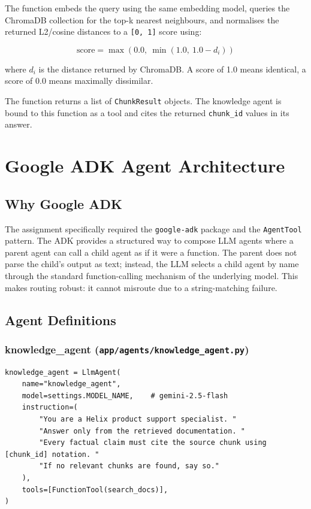 \documentclass[12pt,a4paper]{article}
\begin{document}
The function embeds the query using the same embedding model, queries the ChromaDB collection for the top-k nearest neighbours, and normalises the returned L2/cosine distances to a \texttt{[0, 1]} score using:

\begin{equation}
\text{score} = \max\!\left(0.0,\ \min\!\left(1.0,\ 1.0 - d_i\right)\right)
\end{equation}

where $d_i$ is the distance returned by ChromaDB. A score of 1.0 means identical, a score of 0.0 means maximally dissimilar.

The function returns a list of \texttt{ChunkResult} objects. The knowledge agent is bound to this function as a tool and cites the returned \texttt{chunk\_id} values in its answer.

\section{Google ADK Agent Architecture}

\subsection{Why Google ADK}

The assignment specifically required the \texttt{google-adk} package and the \texttt{AgentTool} pattern. The ADK provides a structured way to compose LLM agents where a parent agent can call a child agent as if it were a function. The parent does not parse the child's output as text; instead, the LLM selects a child agent by name through the standard function-calling mechanism of the underlying model. This makes routing robust: it cannot misroute due to a string-matching failure.

\subsection{Agent Definitions}

\subsubsection{knowledge\_agent (\texttt{app/agents/knowledge\_agent.py})}

\begin{lstlisting}[style=python]
knowledge_agent = LlmAgent(
    name="knowledge_agent",
    model=settings.MODEL_NAME,    # gemini-2.5-flash
    instruction=(
        "You are a Helix product support specialist. "
        "Answer only from the retrieved documentation. "
        "Every factual claim must cite the source chunk using [chunk_id] notation. "
        "If no relevant chunks are found, say so."
    ),
    tools=[FunctionTool(search_docs)],
)
\end{lstlisting}
\end{document}
